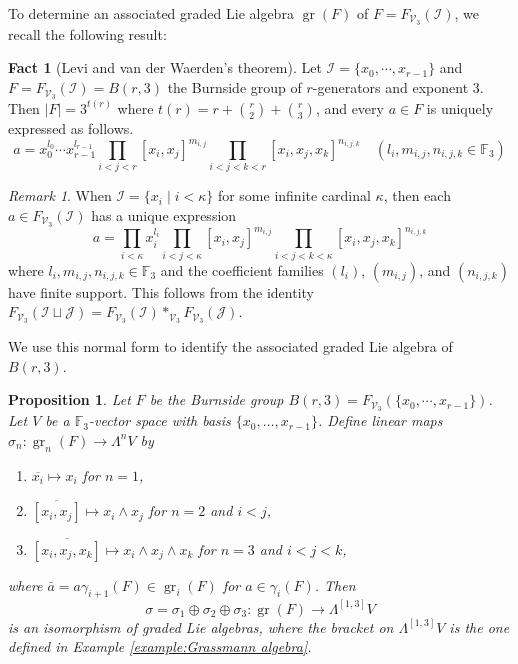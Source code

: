 \documentclass[11pt,reqno]{article}
\newtheorem{proposition}[theorem]{Proposition}
\theoremstyle{definition}
\newtheorem{fact}[theorem]{Fact}
\theoremstyle{remark}
\newtheorem{remark}[theorem]{Remark}
\DeclareMathOperator{\gr}{gr}
\begin{document}
To determine an associated graded Lie algebra $\gr(F)$ of $F=F_{\mathcal V_3}(\mathcal I)$, we recall the following result:
\begin{fact}[Levi and van der Waerden's theorem]\label{fact:Levi and van der Waerden}
    Let $\mathcal I=\{x_0,\cdots, x_{r-1}\}$ and $F=F_{\mathcal V_3}(\mathcal I)=B(r,3)$ the Burnside group of $r$-generators and exponent $3$. Then $|F|=3^{t(r)}$ where $t(r)=r + \binom r2 + \binom r3$, and every $a\in F$ is uniquely expressed as follows.
    \[
    a=x_0^{l_0}\cdots x_{r-1}^{l_{r-1}}
    \prod_{i<j<r}[x_i,x_j]^{m_{i,j}}
    \prod_{i<j<k<r}[x_i,x_j,x_k]^{n_{i,j,k}}
    \quad (l_i,m_{i,j},n_{i,j,k}\in\mathbb F_3)
    \]
\end{fact}

\begin{remark}\label{remark:infinite dim}
    When $\mathcal I=\{x_i\mid i< \kappa\}$ for some infinite cardinal $\kappa$, then each $a\in F_{\mathcal V_3}(\mathcal I)$ has a unique expression
    \[
    a=\prod_{i<\kappa} x_i^{l_i}
    \prod_{i<j<\kappa}[x_i,x_j]^{m_{i,j}}
    \prod_{i<j<k<\kappa}[x_i,x_j,x_k]^{n_{i,j,k}}
    \]
    where $l_i,m_{i,j},n_{i,j,k}\in\mathbb F_3$ and the coefficient families
    $(l_i)$, $(m_{i,j})$, and $(n_{i,j,k})$ have finite support.
    This follows from the identity $F_{\mathcal V_3}(\mathcal I\sqcup \mathcal J)=F_{\mathcal V_3}(\mathcal I)*_{\mathcal V_3}F_{\mathcal V_3}(\mathcal J)$.
\end{remark}

We use this normal form to identify the associated graded Lie algebra of
$B(r,3)$.

\begin{proposition}\label{proposition:gr(F) is Grassmann algebra}
    Let $F$ be the Burnside group $B(r,3)=F_{\mathcal V_3}(\{x_0,\cdots, x_{r-1}\})$.
    Let $V$ be a $\mathbb F_3$-vector space with basis
    $\{x_0,\ldots,x_{r-1}\}$.  Define linear maps
    $\sigma_n:\gr_n(F)\to\Lambda^nV$ by
    \begin{enumerate}
        \item $\overline{x_i}\mapsto x_i$ for $n=1$,
        \item $\overline{[x_i,x_j]}\mapsto x_i\wedge x_j$ for $n=2$ and
        $i<j$,
        \item $\overline{[x_i,x_j,x_k]}\mapsto x_i\wedge x_j\wedge x_k$
        for $n=3$ and $i<j<k$,
    \end{enumerate}
    where $\bar a=a\gamma_{i+1}(F)\in \gr_i(F)$ for $a\in\gamma_i(F)$.
    Then
    \[
    \sigma=\sigma_1\oplus\sigma_2\oplus\sigma_3:
    \gr(F)\longrightarrow\Lambda^{[1,3]}V
    \]
    is an isomorphism of graded Lie algebras, where the bracket on
    $\Lambda^{[1,3]}V$ is the one defined in Example \ref{example:Grassmann algebra}.
\end{proposition}
\end{document}
